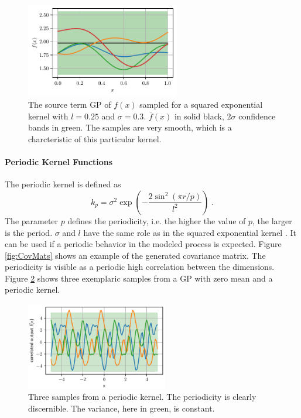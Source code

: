 \documentclass[%
  a4paper,oneside,%
  11pt,%
  smallchapters,
  style=printdev,
  extramargin,
  green,%
  rgb, <cmyk>
  ]{tubsbook}
\begin{document}
\begin{figure}[!ht]
\begin{center}

\includegraphics[width=0.6\textwidth]{pics/sqexp_f_sampled}
\caption[Samples from a GP with squared exponential kernel]{The source term GP of $f(x)$ sampled for a squared exponential kernel with $l = 0.25$ and $\sigma = 0.3$. $\bar{f}(x)$ in solid black, $2\sigma$ confidence bands in green. The samples are very smooth, which is a charcteristic of this particular kernel.}
\label{fig:Sqexp}

\end{center}
\end{figure}

\paragraph{Periodic Kernel Functions}
The periodic kernel is defined as
\begin{equation}
k_p = \sigma^2 \exp(- \frac{2 \sin^2 (\pi r /p)}{l^2}) \;.
\end{equation}
The parameter $p$ defines the periodicity, i.e. the higher the value of $p$, the larger is the period.  $\sigma$ and $l$ have the same role as in the squared exponential kernel \cite{Duvenaud}. 
It can be used if a periodic behavior in the modeled process is expected. Figure \ref{fig:CovMats} shows an example of the generated covariance matrix. The periodicity is visible as a periodic high correlation between the dimensions. Figure \ref{fig:Periodic} shows three exemplaric samples from a GP with zero mean and a periodic kernel.
\begin{figure}[!ht]
\begin{center}
\includegraphics[width=0.55\textwidth]{pics/PeriodicKernel.pdf}
\caption[Samples from a GP with a periodic kernel]{Three samples from a periodic kernel. The periodicity is clearly discernible. The variance, here in green, is constant.}
\label{fig:Periodic}
\end{center}
\end{figure}
\end{document}
